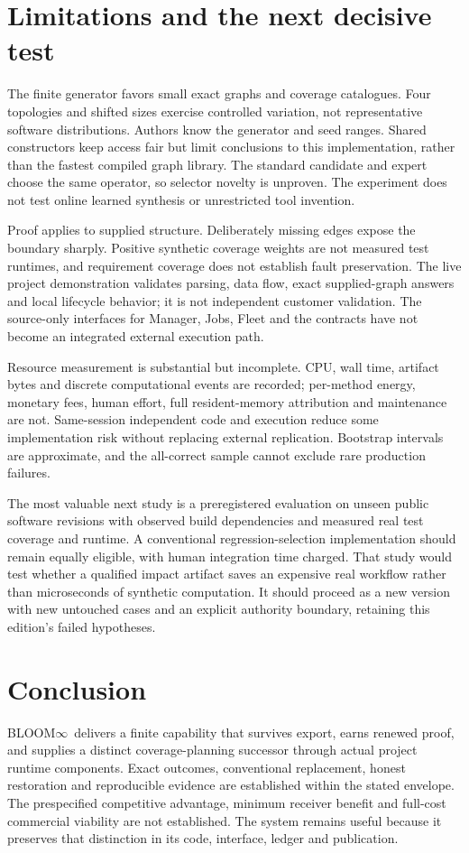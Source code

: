 \documentclass[11pt,letterpaper]{article}
\newcommand{\bloom}{\textsc{BLOOM}$\infty$}
\begin{document}
\FloatBarrier
\section{Limitations and the next decisive test}
The finite generator favors small exact graphs and coverage catalogues. Four topologies and shifted sizes exercise controlled variation, not representative software distributions. Authors know the generator and seed ranges. Shared constructors keep access fair but limit conclusions to this implementation, rather than the fastest compiled graph library. The standard candidate and expert choose the same operator, so selector novelty is unproven. The experiment does not test online learned synthesis or unrestricted tool invention.

Proof applies to supplied structure. Deliberately missing edges expose the boundary sharply. Positive synthetic coverage weights are not measured test runtimes, and requirement coverage does not establish fault preservation. The live project demonstration validates parsing, data flow, exact supplied-graph answers and local lifecycle behavior; it is not independent customer validation. The source-only interfaces for Manager, Jobs, Fleet and the contracts have not become an integrated external execution path.

Resource measurement is substantial but incomplete. CPU, wall time, artifact bytes and discrete computational events are recorded; per-method energy, monetary fees, human effort, full resident-memory attribution and maintenance are not. Same-session independent code and execution reduce some implementation risk without replacing external replication. Bootstrap intervals are approximate, and the all-correct sample cannot exclude rare production failures.

The most valuable next study is a preregistered evaluation on unseen public software revisions with observed build dependencies and measured real test coverage and runtime. A conventional regression-selection implementation should remain equally eligible, with human integration time charged. That study would test whether a qualified impact artifact saves an expensive real workflow rather than microseconds of synthetic computation. It should proceed as a new version with new untouched cases and an explicit authority boundary, retaining this edition's failed hypotheses.

\FloatBarrier
\section{Conclusion}
\bloom\ delivers a finite capability that survives export, earns renewed proof, and supplies a distinct coverage-planning successor through actual project runtime components. Exact outcomes, conventional replacement, honest restoration and reproducible evidence are established within the stated envelope. The prespecified competitive advantage, minimum receiver benefit and full-cost commercial viability are not established. The system remains useful because it preserves that distinction in its code, interface, ledger and publication.
\end{document}
